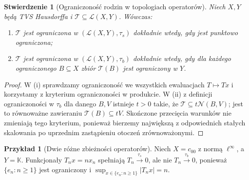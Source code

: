 \documentclass[11pt,a4paper]{article}
\numberwithin{equation}{section}
\theoremstyle{plain}
\newtheorem{stwierdzenie}[twierdzenie]{Stwierdzenie}
\theoremstyle{definition}
\newtheorem{przyklad}[twierdzenie]{Przykład}
\theoremstyle{remark}
\newcommand{\K}{\mathbb K}
\begin{document}
\begin{stwierdzenie}[Ograniczoność rodzin w topologiach operatorów]
\label{prop:op-family-bounded}
Niech $X,Y$ będą TVS Hausdorffa i
$\mathcal T\subseteq\mathcal L(X,Y)$. Wówczas:
\begin{enumerate}[label=\textup{(\roman*)}]
\item $\mathcal T$ jest ograniczona w $(\mathcal L(X,Y),\tau_s)$
dokładnie wtedy, gdy jest punktowo ograniczona;
\item $\mathcal T$ jest ograniczona w $(\mathcal L(X,Y),\tau_b)$
dokładnie wtedy, gdy dla każdego ograniczonego $B\subseteq X$
zbiór $\mathcal T(B)$ jest ograniczony w $Y$.
\end{enumerate}
\end{stwierdzenie}
\begin{proof}
W (i) sprawdzamy ograniczoność we wszystkich ewaluacjach
$T\mapsto Tx$ i korzystamy z kryterium ograniczoności
w produkcie. W (ii) z definicji ograniczoności w
$\tau_b$ dla danego $B,V$ istnieje $t>0$ takie,
że $\mathcal T\subseteq t\mathcal N(B,V)$; jest to
równoważne zawieraniu $\mathcal T(B)\subseteq tV$.
Skończone przecięcia warunków nie zmieniają tego kryterium,
ponieważ bierzemy największą z odpowiednich stałych
skalowania po uprzednim zastąpieniu otoczeń zrównoważonymi.
\end{proof}

\begin{przyklad}[Dwie różne zbieżności operatorów]
Niech $X=c_{00}$ z normą $\ell^\infty$, a $Y=\K$.
Funkcjonały $T_nx=nx_n$ spełniają
$T_n\xrightarrow{\tau_s}0$, ale nie
$T_n\xrightarrow{\tau_b}0$, ponieważ
$\{e_n:n\ge1\}$ jest ograniczony i
$\sup_{x\in\{e_n:n\ge1\}}|T_nx|=n$.
\end{przyklad}
\end{document}
